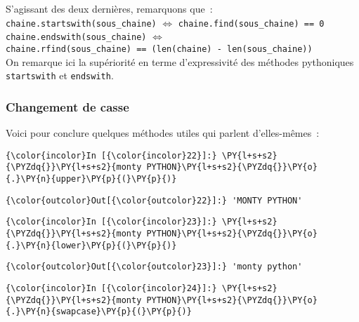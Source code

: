     S'agissant des deux dernières, remarquons que~:\\

    \texttt{chaine.startswith(sous\_chaine)} \(\Longleftrightarrow\)
\texttt{chaine.find(sous\_chaine)\ ==\ 0}\\

\texttt{chaine.endswith(sous\_chaine)} \(\Longleftrightarrow\)
\texttt{chaine.rfind(sous\_chaine)\ ==\ (len(chaine)\ -\ len(sous\_chaine))}\\

    On remarque ici la supériorité en terme d'expressivité des méthodes
pythoniques \texttt{startswith} et \texttt{endswith}.

    \hypertarget{changement-de-casse}{%
\subsubsection{Changement de casse}\label{changement-de-casse}}

    Voici pour conclure quelques méthodes utiles qui parlent d'elles-mêmes~:

    \begin{Verbatim}[commandchars=\\\{\}]
{\color{incolor}In [{\color{incolor}22}]:} \PY{l+s+s2}{\PYZdq{}}\PY{l+s+s2}{monty PYTHON}\PY{l+s+s2}{\PYZdq{}}\PY{o}{.}\PY{n}{upper}\PY{p}{(}\PY{p}{)}
\end{Verbatim}


\begin{Verbatim}[commandchars=\\\{\}]
{\color{outcolor}Out[{\color{outcolor}22}]:} 'MONTY PYTHON'
\end{Verbatim}
            
    \begin{Verbatim}[commandchars=\\\{\}]
{\color{incolor}In [{\color{incolor}23}]:} \PY{l+s+s2}{\PYZdq{}}\PY{l+s+s2}{monty PYTHON}\PY{l+s+s2}{\PYZdq{}}\PY{o}{.}\PY{n}{lower}\PY{p}{(}\PY{p}{)}
\end{Verbatim}


\begin{Verbatim}[commandchars=\\\{\}]
{\color{outcolor}Out[{\color{outcolor}23}]:} 'monty python'
\end{Verbatim}
            
    \begin{Verbatim}[commandchars=\\\{\}]
{\color{incolor}In [{\color{incolor}24}]:} \PY{l+s+s2}{\PYZdq{}}\PY{l+s+s2}{monty PYTHON}\PY{l+s+s2}{\PYZdq{}}\PY{o}{.}\PY{n}{swapcase}\PY{p}{(}\PY{p}{)}
\end{Verbatim}



